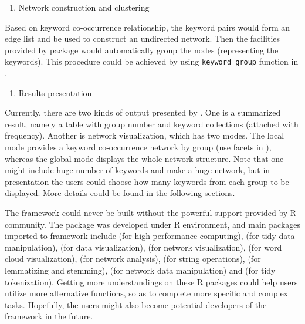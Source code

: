 \begin{enumerate}
\def\labelenumi{(\arabic{enumi})}
\setcounter{enumi}{2}
\tightlist
\item
  Network construction and clustering
\end{enumerate}

Based on keyword co-occurrence relationship, the keyword pairs would
form an edge list and be used to construct an undirected network. Then
the facilities provided by  package would automatically
group the nodes (representing the keywords). This procedure could be
achieved by using \texttt{keyword\_group} function in .

\begin{enumerate}
\def\labelenumi{(\arabic{enumi})}
\setcounter{enumi}{3}
\tightlist
\item
  Results presentation
\end{enumerate}

Currently, there are two kinds of output presented by . One
is a summarized result, namely a table with group number and keyword
collections (attached with frequency). Another is network visualization,
which has two modes. The local mode provides a keyword co-occurrence
network by group (use facets in ), whereas the global
mode displays the whole network structure. Note that one might include
huge number of keywords and make a huge network, but in presentation the
users could choose how many keywords from each group to be displayed.
More details could be found in the following sections.

The  framework could never be built without the powerful
support provided by R community. The  package was developed
under R environment, and main packages imported to 
framework include  (for high performance computing),
 (for tidy data manipulation),  (for
data visualization),  (for network visualization),
 (for word cloud visualization), 
(for network analysis),  (for string operations),
 (for lemmatizing and stemming), 
(for network data manipulation) and  (for tidy
tokenization). Getting more understandings on these R packages could
help users utilize more alternative functions, so as to complete more
specific and complex tasks. Hopefully, the users might also become
potential developers of the  framework in the future.

